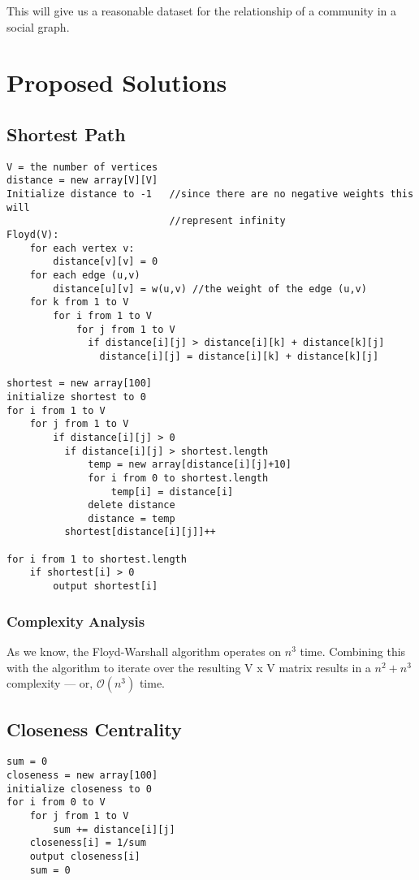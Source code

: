 \documentclass{article}
\begin{document}
This will give us a reasonable dataset for the relationship of a community in a social graph.

\section{Proposed Solutions}
\subsection{Shortest Path}
\begin{verbatim}
V = the number of vertices
distance = new array[V][V]
Initialize distance to -1   //since there are no negative weights this will
                            //represent infinity
Floyd(V):
    for each vertex v:
        distance[v][v] = 0
    for each edge (u,v)
        distance[u][v] = w(u,v) //the weight of the edge (u,v)
    for k from 1 to V
        for i from 1 to V
            for j from 1 to V
              if distance[i][j] > distance[i][k] + distance[k][j]
                distance[i][j] = distance[i][k] + distance[k][j]

shortest = new array[100]
initialize shortest to 0
for i from 1 to V
    for j from 1 to V
        if distance[i][j] > 0
          if distance[i][j] > shortest.length
              temp = new array[distance[i][j]+10]
              for i from 0 to shortest.length
                  temp[i] = distance[i]
              delete distance
              distance = temp
          shortest[distance[i][j]]++

for i from 1 to shortest.length
    if shortest[i] > 0
        output shortest[i]
\end{verbatim}

\subsubsection{Complexity Analysis}
As we know, the Floyd-Warshall algorithm operates on $n^3$ time. Combining this with the algorithm to iterate over the resulting V x V matrix results in a $n^2 + n^3$ complexity --- or, $\mathcal{O}(n^3)$ time.

\subsection{Closeness Centrality}
\begin{verbatim}
sum = 0
closeness = new array[100]
initialize closeness to 0
for i from 0 to V
    for j from 1 to V
        sum += distance[i][j]
    closeness[i] = 1/sum
    output closeness[i]
    sum = 0
\end{verbatim}
\end{document}
